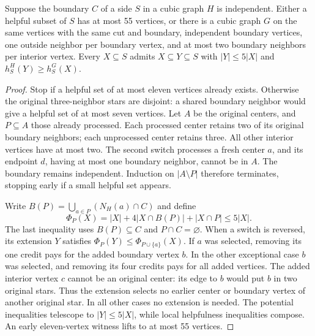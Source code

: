 \begin{theorem}
  \label{thm:lowerbounds-algebraic-neighbor-normalization}
  \leanok
  Suppose the boundary $C$ of a side $S$ in a cubic graph $H$ is independent.
  Either a helpful subset of $S$ has at most 55 vertices, or there is a
  cubic graph $G$ on the same vertices with the same cut and boundary,
  independent boundary vertices, one outside neighbor per boundary vertex,
  and at most two boundary neighbors per interior vertex.
  Every $X\subseteq S$ admits $X\subseteq Y\subseteq S$ with
  $|Y|\le5|X|$ and $h^H_S(Y)\ge h^G_S(X)$.
\end{theorem}
\begin{proof}
  \leanok
  Stop if a helpful set of at most eleven vertices already exists.
  Otherwise the original three-neighbor stars are disjoint: a shared
  boundary neighbor would give a helpful set of at most seven vertices.
  Let $A$ be the original centers, and $P\subseteq A$ those already
  processed. Each processed center retains two of its original boundary
  neighbors; each unprocessed center retains three. All other interior
  vertices have at most two. The second switch processes a fresh center
  $a$, and its endpoint $d$, having at most one boundary neighbor, cannot
  be in $A$. The boundary remains independent. Induction on $|A\setminus P|$
  therefore terminates, stopping early if a small helpful set appears.

  Write $B(P)=\bigcup_{a\in P}(N_H(a)\cap C)$ and define
  \[
    \Phi_P(X)=|X|+4|X\cap B(P)|+|X\cap P|\le5|X|.
  \]
  The last inequality uses $B(P)\subseteq C$ and $P\cap C=\varnothing$.
  When a switch is reversed, its extension $Y$ satisfies
  $\Phi_P(Y)\le\Phi_{P\cup\{a\}}(X)$. If $a$ was selected, removing
  its one credit pays for the added boundary vertex $b$. In the other
  exceptional case $b$ was selected, and removing its four credits pays
  for all added vertices. The added interior vertex $c$ cannot be an
  original center: its edge to $b$ would put $b$ in two original stars.
  Thus the extension selects no earlier center or boundary vertex of
  another original star. In all other cases no extension is needed.
  The potential inequalities telescope to $|Y|\le5|X|$, while local
  helpfulness inequalities compose. An early eleven-vertex witness lifts
  to at most 55 vertices.
\end{proof}

